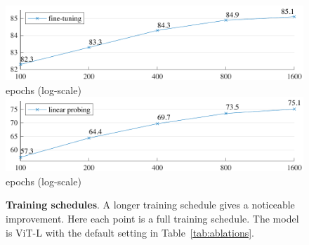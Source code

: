 \documentclass[10pt,twocolumn,letterpaper]{article}
\begin{document}
\begin{figure}[t]\centering
\includegraphics[width=0.99\linewidth]{fig/schedule_ft.pdf}\\
\scriptsize epochs (log-scale) \\
\includegraphics[width=0.99\linewidth]{fig/schedule_linear.pdf}\\
\scriptsize epochs (log-scale) \\
\vspace{-.5em}
\caption{\textbf{Training schedules}. A longer training schedule gives a \mbox{noticeable} improvement. Here each point is a full training schedule. The model is ViT-L with the default setting in Table~\ref{tab:ablations}.}
\label{fig:schedule}
\vspace{-.5em}
\end{figure}
\end{document}
